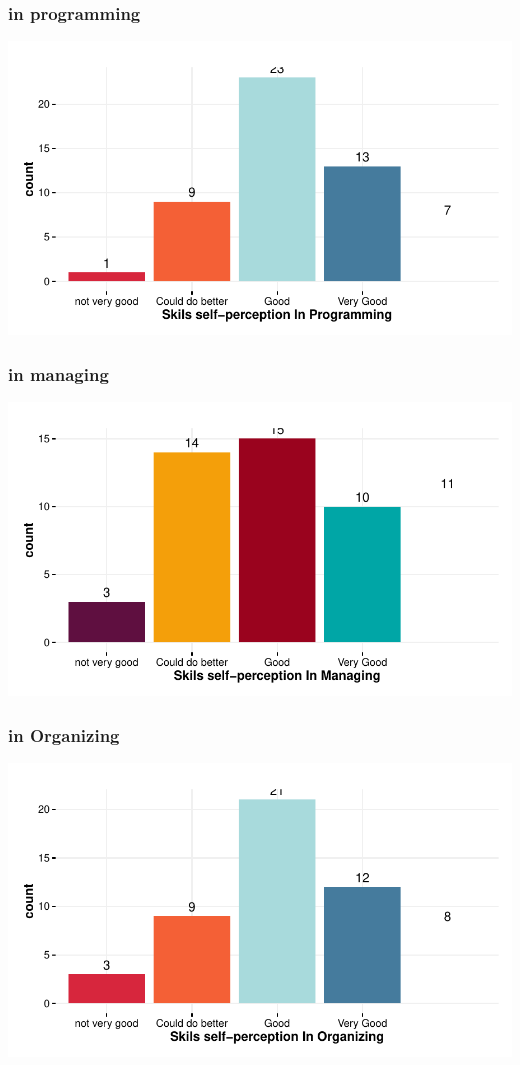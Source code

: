 \documentclass{article}
\begin{document}
\subsubsection{in programming}
\includegraphics{Raw_num/plots/-plot_skill_selfp_prog}

\subsubsection{in managing}
\includegraphics{Raw_num/plots/-plot_skill_selfp_manag}

\subsubsection{in Organizing}
\includegraphics{Raw_num/plots/-plot_skill_selfp_organi}
\end{document}
